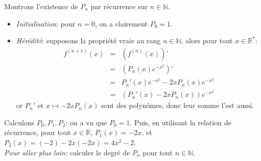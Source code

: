 Montrons l'existence de $P_n$ par récurrence sur $n\in\mathbb{N}$.
\begin{itemize}
  \item \textit{Initialisation}: pour $n=0$, on a clairement $P_0=1$.
  \item \textit{Hérédité}: supposons la propriété vraie au rang $n\in \mathbb{N}$, alors pour tout $x \in \mathbb{R}^*$:
  \begin{eqnarray}
    f^{(n+1)}(x) &=& \left( f^{(n)}(x) \right)'  \nonumber \\
                &=& \left( P_n(x)e^{-x^2} \right)'  \nonumber \\
                &=& P_n'(x)e^{-x^2}-2xP_n(x)e^{-x^2}  \nonumber \\
                &=& \left( P_n'(x) - 2xP_n(x) \right)e^{-x^2} \nonumber 
  \end{eqnarray}
  or $P_n'$ et $x\mapsto-2xP_n(x)$ sont des polynômes, donc leur somme l'est aussi.
\end{itemize}
Calculons $P_0,P_1,P_2$: on a vu que $P_0=1$. Puis, en utilisant la relation de récurrence, pour tout $x\in\mathbb{R}$, $P_1(x)=-2x$, et $P_2(x)=(-2)-2x(-2x)=4x^2-2$.\\

\textit{Pour aller plus loin:} calculer le degré de $P_n$ pour tout $n\in\mathbb{N}$.
